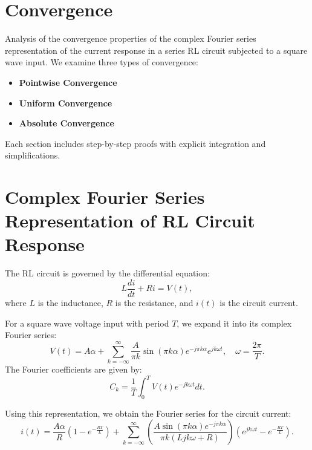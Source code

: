 \section{Convergence}
Analysis of the convergence properties of the complex Fourier series representation of the current response in a series RL circuit subjected to a square wave input. We examine three types of convergence:
\begin{itemize}
  \item \textbf{Pointwise Convergence}
  \item \textbf{Uniform Convergence}
  \item \textbf{Absolute Convergence}
\end{itemize}
Each section includes step-by-step proofs with explicit integration and simplifications.

\section{Complex Fourier Series Representation of RL Circuit Response}
The RL circuit is governed by the differential equation:
\begin{equation}
L \frac{di}{dt} + R i = V(t),
\end{equation}
where $L$ is the inductance, $R$ is the resistance, and $i(t)$ is the circuit current.

For a square wave voltage input with period $T$, we expand it into its complex Fourier series:
\begin{equation}
V(t) = A\alpha + \sum_{k=-\infty}^{\infty} \frac{A}{\pi k} \sin (\pi k \alpha)e^{-j \pi k \alpha} e^{j k \omega t}, \quad \omega = \frac{2\pi}{T}.
\end{equation}
The Fourier coefficients are given by:
\begin{equation}
C_k = \frac{1}{T} \int_{0}^{T} V(t) e^{-j k \omega t} dt.
\end{equation}

Using this representation, we obtain the Fourier series for the circuit current:
\begin{equation}
i(t) = \frac{A \alpha}{R} \left(1 - e^{-\frac{R T}{L}}\right) + \sum_{k=-\infty}^{\infty} \left( \frac{A \sin (\pi k \alpha) e^{-j \pi k \alpha}}{\pi k (L j k \omega + R)} \right) \left(e^{j k \omega t} - e^{-\frac{R T}{L}}\right).
\end{equation}

